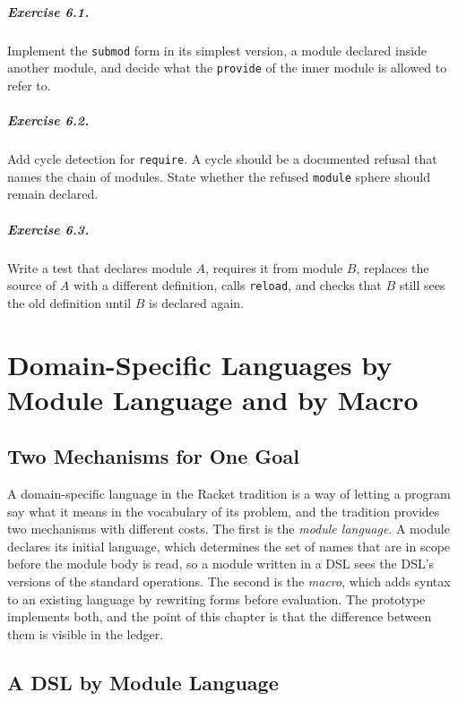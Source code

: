 \paragraph{Exercise 6.1.} Implement the \texttt{submod} form in its simplest version, a module declared inside another module, and decide what the \texttt{provide} of the inner module is allowed to refer to.

\paragraph{Exercise 6.2.} Add cycle detection for \texttt{require}. A cycle should be a documented refusal that names the chain of modules. State whether the refused \texttt{module} sphere should remain declared.

\paragraph{Exercise 6.3.} Write a test that declares module $A$, requires it from module $B$, replaces the source of $A$ with a different definition, calls \texttt{reload}, and checks that $B$ still sees the old definition until $B$ is declared again.

\chapter{Domain-Specific Languages by Module Language and by Macro}

\section{Two Mechanisms for One Goal}

A domain-specific language in the Racket tradition is a way of letting a program say what it means in the vocabulary of its problem, and the tradition provides two mechanisms with different costs. The first is the \emph{module language}. A module declares its initial language, which determines the set of names that are in scope before the module body is read, so a module written in a DSL sees the DSL's versions of the standard operations. The second is the \emph{macro}, which adds syntax to an existing language by rewriting forms before evaluation. The \SP{} prototype implements both, and the point of this chapter is that the difference between them is visible in the ledger.

\section{A DSL by Module Language}

